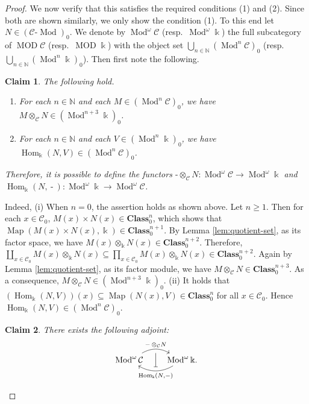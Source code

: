 \documentclass{surv-l}
\numberwithin{equation}{chapter}
\numberwithin{figure}{chapter}
\theoremstyle{plain}
\newtheorem{clm}{Claim}
\theoremstyle{definition}
\theoremstyle{remark}
\newcommand{\lMod}{\text{-}\!\Mod}
\newcommand{\Ar}[3]{\ar[from={#1}, to={#2}, #3]}
\DeclareMathOperator{\Hom}{Hom}
\DeclareMathOperator{\Mod}{Mod}
\DeclareMathOperator{\MOD}{MOD}
\DeclareMathOperator{\blank}{-}
\DeclareMathOperator{\Map}{Map}
\begin{document}
\begin{proof}
We now verify that this satisfies the required conditions (1) and (2).
Since both are shown similarly, we only show the condition (1).
To this end let $N \in ({\mathcal{C}}\lMod)_0$.
We denote by $\Mod^\omega {\mathcal{C}}$ (resp.\ $\Mod^\omega \Bbbk$)
the full subcategory of $\MOD {\mathcal{C}}$ (resp.\ $\MOD \Bbbk$)
with the object set $\bigcup_{n \in \mathbb{N}}(\Mod^n{\mathcal{C}})_0$ (resp.\ $\bigcup_{n \in \mathbb{N}}(\Mod^n\Bbbk)_0$).
Then first note the following. %
\setcounter{clm}{0}\begin{clm}
The following hold.
\begin{enumerate}[label=(\roman*)]
\item
For each $n \!\in\! \mathbb{N}$ and each $M \!\in\! (\Mod^n{\mathcal{C}})_0$,
we have $M \otimes_{\mathcal{C}} N \!\in\! (\Mod^{n+3}\Bbbk)_0$.
\item
For each $n \!\in\! \mathbb{N}$ and each $V \!\!\in\! (\Mod^n\Bbbk)_0$,
we have $\Hom_\Bbbk(N, V) \!\in\! (\Mod^{n}{\mathcal{C}})_0$.
\end{enumerate}
Therefore, it is possible to define the functors
$\blank \otimes_{\mathcal{C}} N \colon \Mod^\omega{\mathcal{C}} \to \Mod^\omega\Bbbk$ and
$\Hom_\Bbbk(N, \blank) \colon \Mod^\omega\Bbbk \to \Mod^\omega{\mathcal{C}}$.
\end{clm}
Indeed, (i) When $n =0$, the assertion holds as shown above.
Let $n \ge 1$.
Then for each $x \in {\mathcal{C}}_0$, $M(x) \times N(x) \in \mathbf{Class}_0^n$,
which shows that $\Map(M(x) \times N(x), \Bbbk) \in \mathbf{Class}_0^{n+1}$.
By Lemma \ref{lem:quotient-set},
as its factor space, we have
$M(x) \otimes_\Bbbk N(x) \in \mathbf{Class}_0^{n+2}$.
Therefore,
$\coprod_{x \in {\mathcal{C}}_0} M(x) \otimes_\Bbbk N(x) \subseteq \prod_{x \in {\mathcal{C}}_0} M(x) \otimes_\Bbbk N(x)  \in \mathbf{Class}_0^{n+2}$.
Again by Lemma \ref{lem:quotient-set},
as its factor module, we have
$M \otimes_{\mathcal{C}} N \in \mathbf{Class}_0^{n+3}$.
As a consequence, $M \otimes_{\mathcal{C}} N \in  (\Mod^{n+3}\Bbbk)_0$.
(ii) It holds that
$(\Hom_\Bbbk(N, V))(x) \subseteq \Map(N(x), V) \in \mathbf{Class}_0^n$
for all $x \in {\mathcal{C}}_0$.
Hence $\Hom_\Bbbk(N, V) \in (\Mod^{n}{\mathcal{C}})_0$.

\begin{clm}
There exists the following adjoint:
\[
\begin{tikzcd}[row sep=4em, column sep=2em]
\Mod^\omega {\mathcal{C}} \ar[r, bend left, "\blank \otimes_{\mathcal{C}} N", "" '{name=D-L}]
& \Mod^\omega \Bbbk. \ar[l, bend left, "{\Hom_\Bbbk(N,\blank)}", "" '{name=U-R}]
\Ar{D-L}{U-R}{-|}
\end{tikzcd}
\]
\end{clm}


\end{proof}
\end{document}
